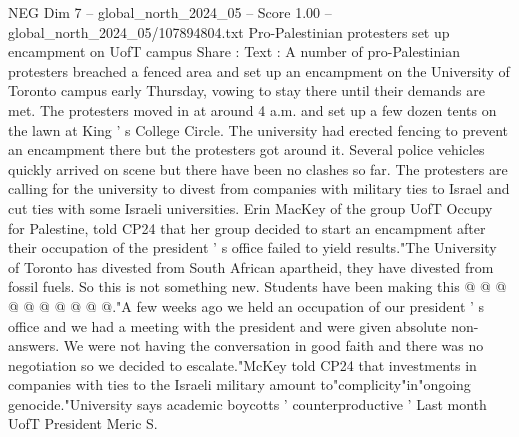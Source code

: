 \begin{textsample}{NEG Dim 7 – global\_north\_2024\_05 – Score 1.00 – global\_north\_2024\_05/107894804.txt}  \label{ex:f7_neg_402}
Pro-Palestinian protesters set up encampment on UofT campus Share : Text : A number of pro-Palestinian protesters breached a fenced area and set up an encampment on the University of Toronto campus early Thursday, vowing to stay there until their demands are met.
The protesters moved in at around 4 a.m. and set up a few dozen tents on the lawn at King ' s College Circle.
The university had erected fencing to prevent an encampment there but the protesters got around it.
Several police vehicles quickly arrived on scene but there have been no clashes so far.
The protesters are calling for the university to divest from companies with military ties to Israel and cut ties with some Israeli universities.
Erin MacKey of the group UofT Occupy for Palestine, told CP24 that her group decided to start an encampment after their occupation of the president ' s office failed to yield results."The University of Toronto has divested from South African apartheid, they have divested from fossil fuels.
So this is not something new.
Students have been making this @ @ @ @ @ @ @ @ @ @."A few weeks ago we held an occupation of our president ' s office and we had a meeting with the president and were given absolute non-answers.
We were not having the conversation in good faith and there was no negotiation so we decided to escalate."McKey told CP24 that investments in companies with ties to the Israeli military amount to"complicity"in"ongoing genocide."University says academic boycotts ' counterproductive ' Last month UofT President Meric S.

\end{textsample}
